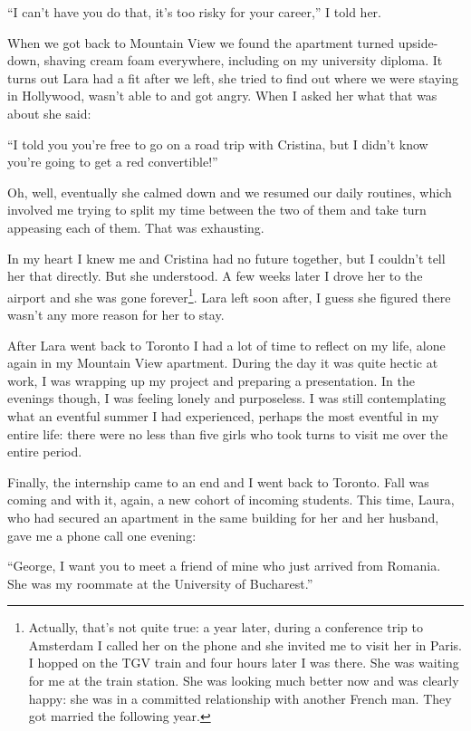 \documentclass[12pt]{book}
\begin{document}
``I can't have you do that, it's too risky for your career,'' I told
her.

When we got back to Mountain View we found the apartment turned
upside-down, shaving cream foam everywhere, including on my university
diploma. It turns out Lara had a fit after we left, she tried to find
out where we were staying in Hollywood, wasn't able to and got angry.
When I asked her what that was about she said:

``I told you you're free to go on a road trip with Cristina, but I
didn't know you're going to get a red convertible!''

Oh, well, eventually she calmed down and we resumed our daily routines,
which involved me trying to split my time between the two of them and
take turn appeasing each of them. That was exhausting.

In my heart I knew me and Cristina had no future together, but I
couldn't tell her that directly. But she understood. A few weeks later I
drove her to the airport and she was gone
forever\footnote{
  Actually, that's not quite true: a year later, during a conference
  trip to Amsterdam I called her on the phone and she invited me to
  visit her in Paris. I hopped on the TGV train and four hours later I
  was there. She was waiting for me at the train station. She was
  looking much better now and was clearly happy: she was in a committed
  relationship with another French man. They got married the following
  year.}. Lara left soon after, I guess she figured there wasn't any
more reason for her to stay.

After Lara went back to Toronto I had a lot of time to reflect on my
life, alone again in my Mountain View apartment. During the day it was
quite hectic at work, I was wrapping up my project and preparing a
presentation. In the evenings though, I was feeling lonely and
purposeless. I was still contemplating what an eventful summer I had
experienced, perhaps the most eventful in my entire life: there were no
less than five girls who took turns to visit me over the entire period.

Finally, the internship came to an end and I went back to Toronto. Fall
was coming and with it, again, a new cohort of incoming students. This
time, Laura, who had secured an apartment in the same building for her
and her husband, gave me a phone call one evening:

``George, I want you to meet a friend of mine who just arrived from
Romania. She was my roommate at the University of Bucharest.''
\end{document}
